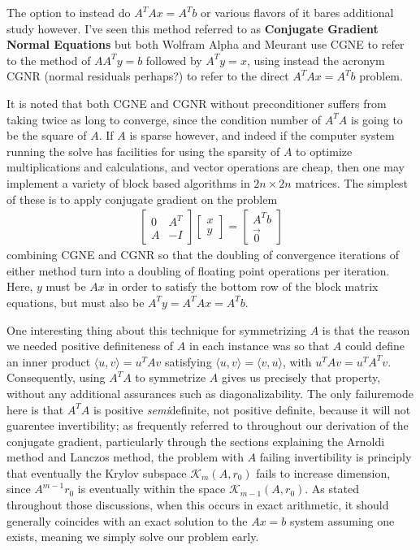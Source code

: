 \documentclass[11pt]{article}
\begin{document}
The option to instead do $A^T A x = A^T b$ or various flavors of it bares additional study however. I've seen this method referred to as \textbf{Conjugate Gradient Normal Equations} but both Wolfram Alpha and Meurant use CGNE to refer to the method of $A A^T y = b$ followed by $A^T y = x$, using instead the acronym CGNR (normal residuals perhaps?) to refer to the direct $A^T A x = A^T b$ problem.

It is noted that both CGNE and CGNR without preconditioner suffers from taking twice as long to converge, since the condition number of $A^T A$ is going to be the square of $A$. If $A$ is sparse however, and indeed if the computer system running the solve has facilities for using the sparsity of $A$ to optimize multiplications and calculations, and vector operations are cheap, then one may implement a variety of block based algorithms in $2n\times 2n$ matrices. The simplest of these is to apply conjugate gradient on the problem \begin{gather*}
\begin{bmatrix} 0 & A^T \\ A & -I \end{bmatrix} \begin{bmatrix} x \\ y \end{bmatrix} = \begin{bmatrix} A^T b \\ \vec 0 \end{bmatrix}
\end{gather*}
combining CGNE and CGNR so that the doubling of convergence iterations of either method turn into a doubling of floating point operations per iteration. Here, $y$ must be $Ax$ in order to satisfy the bottom row of the block matrix equations, but must also be $A^T y = A^T A x = A^T b$.

One interesting thing about this technique for symmetrizing $A$ is that the reason we needed positive definiteness of $A$ in each instance was so that $A$ could define an inner product $\langle u,v \rangle = u^T A v$ satisfying $\langle u,v \rangle = \langle v , u \rangle$, with $u^T A v = u^T A^T v$. Consequently, using $A^T A$ to symmetrize $A$ gives us precisely that property, without any additional assurances such as diagonalizability. The only failuremode here is that $A^T A$ is positive \emph{semi}definite, not positive definite, because it will not guarentee invertibility; as frequently referred to throughout our derivation of the conjugate gradient, particularly through the sections explaining the Arnoldi method and Lanczos method, the problem with $A$ failing invertibility is principly that eventually the Krylov subspace $\mathcal K_m(A, r_0)$ fails to increase dimension, since $A^{m-1}r_0$ is eventually within the space $\mathcal K_{m-1}(A,r_0)$. As stated throughout those discussions, when this occurs in exact arithmetic, it should generally coincides with an exact solution to the $Ax = b$ system assuming one exists, meaning we simply solve our problem early.
\end{document}
